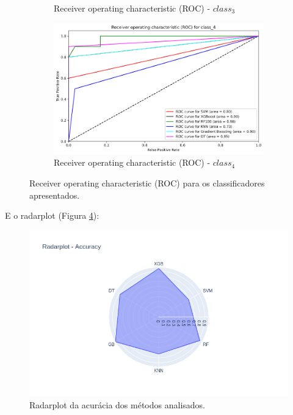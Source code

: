 \documentclass[
	article,			%
	11pt,				%
	oneside,			%
	a4paper,			%
	english,			%
	brazil,				%
	sumario=tradicional
	]{abntex2}
\begin{document}
\begin{figure}
\begin{subfigure}[b]{0.475\textwidth}
    \caption{Receiver operating characteristic (ROC) - $class_3$}
    \label{fig:roc3}
    \end{subfigure}
    \hfill
    \begin{subfigure}[b]{0.475\textwidth}
    \centering
    \includegraphics[scale=0.25]{fig/roc4.png}
    \caption{Receiver operating characteristic (ROC) - $class_4$}
    \label{fig:roc4}
    \end{subfigure}
    \caption{Receiver operating characteristic (ROC) para os classificadores apresentados.}
    \label{roc}
\end{figure}

E o radarplot (Figura \ref{fig:radar}):

\begin{figure}[h!]
 \centering
 \includegraphics[scale=0.5]{fig/radarplot.png}
 \caption{Radarplot da acurácia dos métodos analisados.}
 \label{fig:radar}
\end{figure}
\end{document}
